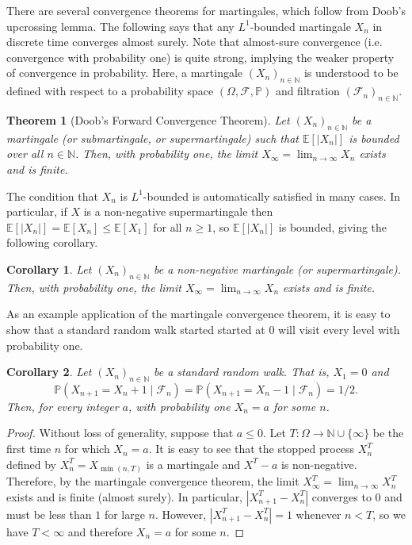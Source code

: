 \documentclass[12pt]{article}
\newtheorem*{theorem*}{Theorem}
\newtheorem*{corollary*}{Corollary}
\begin{document}
There are several convergence theorems for martingales, which follow from Doob's upcrossing lemma. The following says that any $L^1$-bounded martingale $X_n$ in discrete time converges almost surely.
Note that almost-sure convergence (i.e. convergence with probability one) is quite strong, implying the weaker property of convergence in probability. Here, a martingale $(X_n)_{n\in\mathbb{N}}$ is understood to be defined with respect to a probability space $(\Omega,\mathcal{F},\mathbb{P})$ and filtration $(\mathcal{F}_n)_{n\in\mathbb{N}}$.

\begin{theorem*}[Doob's Forward Convergence Theorem]
Let $(X_n)_{n\in\mathbb{N}}$ be a martingale (or submartingale, or supermartingale) such that $\mathbb{E}[|X_n|]$ is bounded over all $n\in\mathbb{N}$. Then, with probability one, the limit $X_\infty=\lim_{n\rightarrow\infty}X_n$ exists and is finite.
\end{theorem*}

The condition that $X_n$ is $L^1$-bounded is automatically satisfied in many cases. In particular, if $X$ is a non-negative supermartingale then $\mathbb{E}[|X_n|]=\mathbb{E}[X_n]\le\mathbb{E}[X_1]$ for all $n\ge 1$, so $\mathbb{E}[|X_n|]$ is bounded, giving the following corollary.

\begin{corollary*}
Let $(X_n)_{n\in\mathbb{N}}$ be a non-negative martingale (or supermartingale). Then, with probability one, the limit $X_\infty=\lim_{n\rightarrow\infty}X_n$ exists and is finite.
\end{corollary*}

As an example application of the martingale convergence theorem, it is easy to show that a standard random walk started started at $0$ will visit every level with probability one.

\begin{corollary*}
Let $(X_n)_{n\in\mathbb{N}}$ be a standard random walk. That is, $X_1=0$ and
\begin{equation*}
\mathbb{P}(X_{n+1}=X_n+1\mid \mathcal{F}_n)=\mathbb{P}(X_{n+1}=X_n-1\mid\mathcal{F}_n) = 1/2.
\end{equation*}
Then, for every integer $a$, with probability one $X_n=a$ for some $n$.
\end{corollary*}
\begin{proof}
Without loss of generality, suppose that $a\le 0$. Let $T:\Omega\rightarrow\mathbb{N}\cup\{\infty\}$ be the first time $n$ for which $X_n=a$. It is easy to see that the stopped process $X^T_n$ defined by $X^T_n=X_{\min(n,T)}$ is a martingale and $X^T-a$ is non-negative. Therefore, by the martingale convergence theorem, the limit $X^T_\infty=\lim_{n\rightarrow\infty}X^T_n$ exists and is finite (almost surely). In particular, $|X^T_{n+1}-X^T_n|$ converges to $0$ and must be less than $1$ for large $n$. However, $|X^T_{n+1}-X^T_n|=1$ whenever $n<T$, so we have $T<\infty$ and therefore $X_n=a$ for some $n$.
\end{proof}

\end{document}
